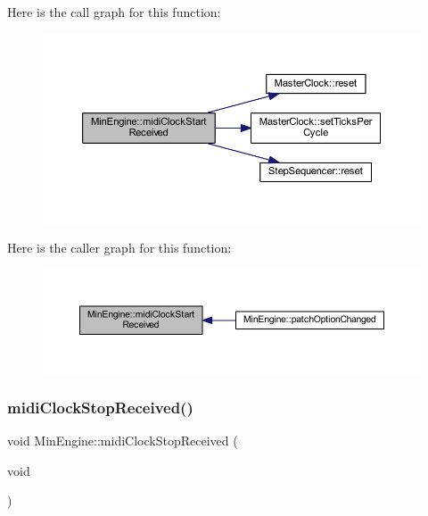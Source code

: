Here is the call graph for this function\+:
\nopagebreak
\begin{figure}[H]
\begin{center}
\leavevmode
\includegraphics[width=350pt]{class_min_engine_ad0378027f052b780481611fa4335b68d_cgraph}
\end{center}
\end{figure}
Here is the caller graph for this function\+:
\nopagebreak
\begin{figure}[H]
\begin{center}
\leavevmode
\includegraphics[width=350pt]{class_min_engine_ad0378027f052b780481611fa4335b68d_icgraph}
\end{center}
\end{figure}
\mbox{\label{class_min_engine_a08ac0328006e01f44ffbb3c78f4f504a}} 
\subsubsection{\texorpdfstring{midi\+Clock\+Stop\+Received()}{midiClockStopReceived()}}
{\footnotesize\ttfamily void Min\+Engine\+::midi\+Clock\+Stop\+Received (\begin{DoxyParamCaption}\item[{void}]{ }\end{DoxyParamCaption})\hspace{0.3cm}{\ttfamily [virtual]}}



